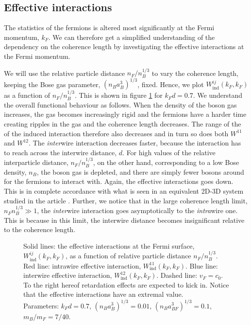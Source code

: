 \subsection{Effective interactions} \label{subsec.effectiveinteractions}
The statistics of the fermions is altered most significantly at the Fermi momentum, $k_F$. We can therefore get a simplified understanding of the dependency on the coherence length by investigating the effective interactions at the Fermi momentum. 

We will use the relative particle distance $n_F / n_B^{1/3}$ to vary the coherence length, keeping the Bose gas parameter, $(n_Ba_B^3)^{1/3}$, fixed. Hence, we plot $W^{ij}_{\text{ind}}(k_F,k_F)$ as a function of $n_F / n_B^{1/3}$. This is shown in figure \ref{fig.EffectiveInteraction.nBdepend} for $k_Fd = 0.7$. We understand the overall functional behaviour as follows. When the density of the boson gas increases, the gas becomes increasingly rigid and the fermions have a harder time creating ripples in the gas and the coherence length decreases. The range of the of the induced interaction therefore also decreases and in turn so does both $W^{11}$ and $W^{12}$. The \textit{inter}wire interaction decreases faster, because the interaction has to reach across the interwire distance, $d$. For high values of the relative interparticle distance, $n_F / n_B^{1/3}$, on the other hand, corresponding to a low Bose density, $n_B$, the boson gas is depleted, and there are simply fewer bosons around for the fermions to interact with. Again, the effective interactions goes down. This is in complete accordance with what is seen in an equivalent 2D-3D system studied in the article \cite{BruunZhigangTopSuperfluid}. Further, we notice that in the large coherence length limit, $n_Fn_B^{1/3} \gg 1$, the \textit{inter}wire interaction goes asymptotically to the \textit{intra}wire one. This is because in this limit, the interwire distance becomes insignificant relative to the coherence length. 

\begin{figure} 
\begin{center}  
  
\caption{Solid lines: the effective interactions at the Fermi surface, $W^{ij}_{\text{ind}}(k_F,k_F)$, as a function of relative particle distance $n_F/n_B^{1/3}$. Red line: intrawire effective interaction, $W^{11}_{\text{ind}}(k_F,k_F)$. Blue line: interwire effective interaction, $W^{12}_{\text{ind}}(k_F,k_F)$. Dashed line: $v_F = c_0$. To the right hereof retardation effects are expected to kick in. Notice that the effective interactions have an extremal value. \\
Parameters: $k_Fd = 0.7$, $(n_Ba_B^3)^{1/3} = 0.01$, $(n_Ba_{BF}^3)^{1/3} = 0.1$, $m_B / m_F = 7/40$.}  
\label{fig.EffectiveInteraction.nBdepend}  
\end{center}    
\end{figure}

